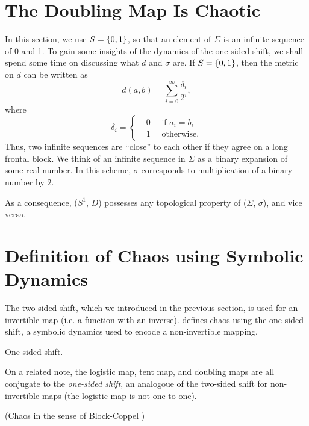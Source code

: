 \documentclass[12pt,twoside]{book}
\begin{document}
\section{The Doubling Map Is Chaotic}
In this section, we use $S = \left \{ 0,1 \right \}$, so that an element of $\Sigma$ is an infinite sequence of 0 and 1.
To gain some insights of the dynamics of the one-sided shift, we shall spend some time on discussing what $d$ and $\sigma$ are.
If $S = \left \{ 0,1 \right \}$, then the metric on $d$ can be written as
\begin{equation*}
  d(a,b) = \sum\limits_{i = 0}^{\infty} \frac{\delta_{i}}{2^i},
\end{equation*}
where
\begin{equation*}
  \delta_i = 
  \begin{cases}
    &0 \quad \mbox{ if } a_i = b_i  \\
    &1 \quad \mbox{ otherwise.}
  \end{cases}
\end{equation*}
Thus, two infinite sequences are ``close'' to each other if they agree on a long frontal block.
We think of an infinite sequence in $\Sigma$ as a binary expansion of some real number.
In this scheme, $\sigma$ corresponds to multiplication of a binary number by $2$.

As a consequence, ($S^1 $, $D$) possesses any topological property of ($\Sigma$, $\sigma$), and vice versa.


\section{Definition of Chaos using Symbolic Dynamics}
The two-sided shift, which we introduced in the previous section, is used for an invertible map (i.e. a function with an inverse).
\citet{blockcoppel} defines chaos using the one-sided shift, a symbolic dynamics used to encode a non-invertible mapping.
\begin{definition}
  One-sided shift.
\end{definition}
On a related note, the logistic map, tent map, and doubling maps are all conjugate to the \textit{one-sided shift}, an analogoue of the two-sided shift for non-invertible maps (the logistic map is not one-to-one).
\begin{definition}
  (Chaos in the sense of Block-Coppel \citep{blockcoppel})
  \label{defn:blockcoppel}
\end{definition}





\printindex
\end{document}
